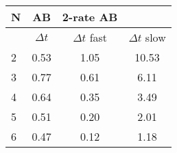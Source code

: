 \begin{tabular}{l|c|cc}
N & AB & 2-rate AB\\
\hline
 & $\Delta t$ & $\Delta t$ fast & $\Delta t$ slow\\
\hline
2 & 0.53& 1.05 & 10.53 \\
\hline
3 & 0.77& 0.61 & 6.11 \\
\hline
4 & 0.64& 0.35 & 3.49 \\
\hline
5 & 0.51& 0.20 & 2.01 \\
\hline
6 & 0.47& 0.12 & 1.18 \\
\hline
\end{tabular}
